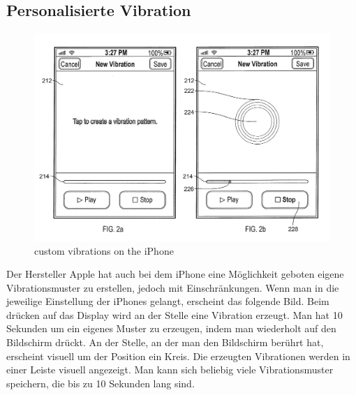  
\subsection{Personalisierte Vibration}
\label{ch:Grundlagen:sec:RelatedWork:subsec:PersonalisierteVibration}

\begin{figure}
	\centering
    \includegraphics[width=\textwidth]{pics/iphone.png}
    \caption{custom vibrations on the iPhone}
    \label{fig:iphone}
\end{figure}

Der Hersteller Apple hat auch bei dem iPhone eine M{\"o}glichkeit geboten eigene Vibrationsmuster zu erstellen, jedoch mit Einschr{\"a}nkungen.
Wenn man in die jeweilige Einstellung der iPhones gelangt, erscheint das folgende Bild. Beim dr{\"u}cken auf das Display wird an der Stelle eine Vibration erzeugt. Man hat 10 Sekunden um ein eigenes Muster zu erzeugen, indem man wiederholt auf den Bildschirm dr{\"u}ckt. An der Stelle, an der man den Bildschirm ber{\"u}hrt hat, erscheint visuell um der Position ein Kreis. Die erzeugten Vibrationen werden in einer Leiste visuell angezeigt. 
Man kann sich beliebig viele Vibrationsmuster speichern, die bis zu 10 Sekunden lang sind. \cite{fleizach2016custom}

